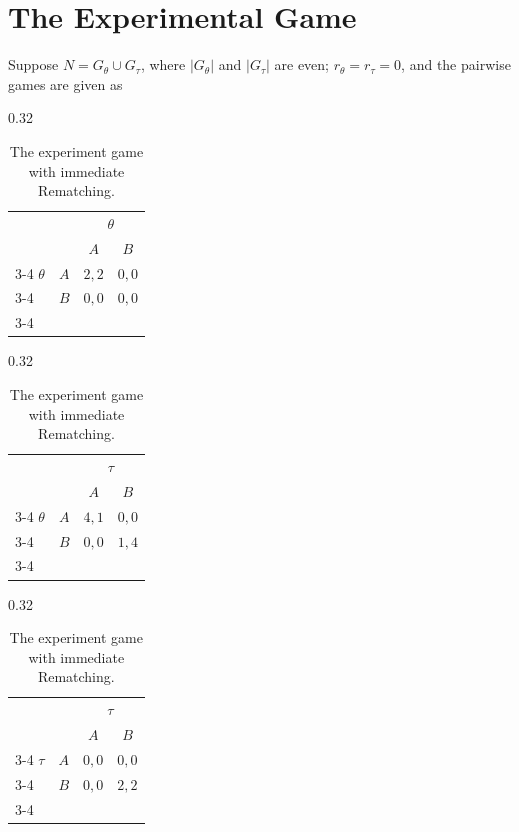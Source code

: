 \documentclass{myPaper}
\begin{document}
\section{The Experimental Game}
Suppose $N=G_\theta \cup G_\tau$, where $|G_\theta|$ and $|G_\tau|$ are even; $r_\theta=r_\tau=0$, and the pairwise games are given as
\begin{table}[!ht]
\centering
\begin{subtable}{0.32\textwidth}
\centering
\begin{tabular}
[c]{llrc}
&  & \multicolumn{2}{c}{$\theta$} \\
&  & \multicolumn{1}{c}{$A$} & $B$ \\\cline{3-4}%
$\theta$ & $A$ & \multicolumn{1}{|l}{$2,2$} & \multicolumn{1}{|l|}{$0, 0$%
}\\\cline{3-4}
& $B$ & \multicolumn{1}{|l}{$0, 0$} & \multicolumn{1}{|l|}{$0, 0$}\\\cline{3-4}%
\end{tabular}
\caption{$\Gamma_{\theta\theta}$.}
\end{subtable}
\hfill
\begin{subtable}{0.32\textwidth}
\centering
\begin{tabular}
[c]{llrc}
&  & \multicolumn{2}{c}{$\tau$} \\
&  & \multicolumn{1}{c}{$A$} & $B$ \\\cline{3-4}%
$\theta$ & $A$ & \multicolumn{1}{|l}{$4, 1$} & \multicolumn{1}{|l|}{$0, 0$%
}\\\cline{3-4}
& $B$ & \multicolumn{1}{|l}{$0, 0$} & \multicolumn{1}{|l|}{$1, 4$}\\\cline{3-4}%
\end{tabular}
\caption{$\Gamma_{\theta\tau}$.}
\end{subtable}
\hfill
\begin{subtable}{0.32\textwidth}
\centering
\begin{tabular}
[c]{llrc}
&  & \multicolumn{2}{c}{$\tau$} \\
&  & \multicolumn{1}{c}{$A$} & $B$ \\\cline{3-4}%
$\tau$ & $A$ & \multicolumn{1}{|l}{$0,0$} & \multicolumn{1}{|l|}{$0, 0$%
}\\\cline{3-4}
& $B$ & \multicolumn{1}{|l}{$0, 0$} & \multicolumn{1}{|l|}{$2, 2$}\\\cline{3-4}%
\end{tabular}
\caption{$\Gamma_{\tau\tau}$.}
\end{subtable}

\caption{The experiment game with immediate Rematching.}
\end{table}
\end{document}
